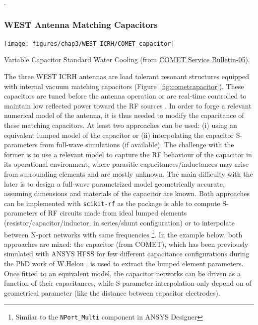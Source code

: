 {. 


\subsubsection{WEST Antenna Matching Capacitors}
\begin{marginfigure}
	\centering
	\texttt{[image: figures/chap3/WEST\_ICRH/COMET\_capacitor]}
	\caption{Variable Capacitor Standard Water Cooling (from \href{https://www.comet-pct.com/getmedia/525c5fbc-2356-4c2e-8e62-3f8a3c3da16c/SB-05_Variable_Capacitor_Water_Cooling.aspx}{COMET Service Bulletin-05}).	
}
	\label{fig:cometcapacitor}
\end{marginfigure}

The three WEST ICRH antennas are load tolerant resonant structures equipped with internal vacuum matching capacitors (Figure~\ref{fig:cometcapacitor}). These capacitors are tuned before the antenna operation or are real-time controlled to maintain low reflected power toward the RF sources . In order to forge a relevant numerical model of the antenna, it is thus needed to modify the capacitance of these matching capacitors. At least two approaches can be used: (i) using an equivalent lumped model of the capacitor or (ii) interpolating the capacitor S-parameters from full-wave simulations (if available). The challenge with the former is to use a relevant model to capture the RF behaviour of the capacitor in its operational environment, where parasitic capacitances/inductances may arise from surrounding elements and are mostly unknown. The main difficulty with the later is to design a full-wave parametrized model geometrically accurate, assuming dimensions and materials of the capacitor are known. Both approaches can be implemented with \texttt{scikit-rf} as the package is able to compute S-parameters of RF circuits made from ideal lumped elements (resistor/capacitor/inductor, in series/shunt configuration)  or to interpolate between N-port networks with same frequencies \footnote{Similar to the \texttt{NPort\_Multi} component in ANSYS Designer}. In the example below, both approaches are mixed: the capacitor (from COMET), which has been previously simulated with ANSYS HFSS for few different capacitance configurations during the PhD work of W.Helou , is used to extract the lumped element parameters. Once fitted to an equivalent model, the capacitor networks can be driven as a function of their capacitances, while S-parameter interpolation only depend on of geometrical parameter (like the distance between capacitor electrodes).

}
